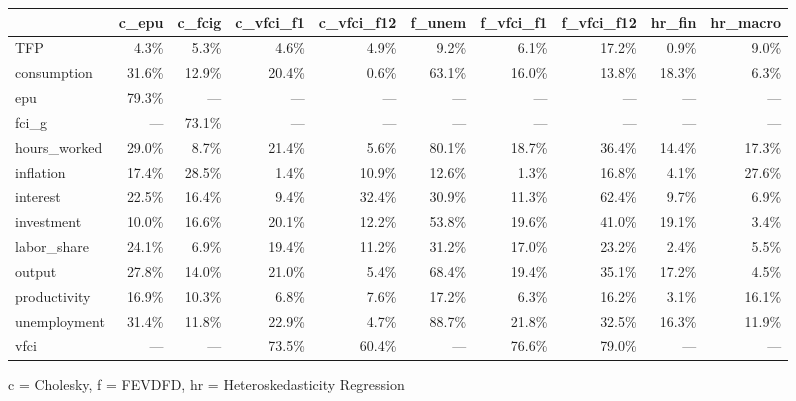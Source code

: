 
\fontsize{12.0pt}{14.4pt}\selectfont
\begin{tabular*}{\linewidth}{@{\extracolsep{\fill}}l|rrrrrrrrr}
\toprule
 & c\_epu & c\_fcig & c\_vfci\_f1 & c\_vfci\_f12 & f\_unem & f\_vfci\_f1 & f\_vfci\_f12 & hr\_fin & hr\_macro \\ 
\midrule\addlinespace[2.5pt]
TFP & 4.3\% & 5.3\% & 4.6\% & 4.9\% & 9.2\% & 6.1\% & 17.2\% & 0.9\% & 9.0\% \\ 
consumption & 31.6\% & 12.9\% & 20.4\% & 0.6\% & 63.1\% & 16.0\% & 13.8\% & 18.3\% & 6.3\% \\ 
epu & 79.3\% & — & — & — & — & — & — & — & — \\ 
fci\_g & — & 73.1\% & — & — & — & — & — & — & — \\ 
hours\_worked & 29.0\% & 8.7\% & 21.4\% & 5.6\% & 80.1\% & 18.7\% & 36.4\% & 14.4\% & 17.3\% \\ 
inflation & 17.4\% & 28.5\% & 1.4\% & 10.9\% & 12.6\% & 1.3\% & 16.8\% & 4.1\% & 27.6\% \\ 
interest & 22.5\% & 16.4\% & 9.4\% & 32.4\% & 30.9\% & 11.3\% & 62.4\% & 9.7\% & 6.9\% \\ 
investment & 10.0\% & 16.6\% & 20.1\% & 12.2\% & 53.8\% & 19.6\% & 41.0\% & 19.1\% & 3.4\% \\ 
labor\_share & 24.1\% & 6.9\% & 19.4\% & 11.2\% & 31.2\% & 17.0\% & 23.2\% & 2.4\% & 5.5\% \\ 
output & 27.8\% & 14.0\% & 21.0\% & 5.4\% & 68.4\% & 19.4\% & 35.1\% & 17.2\% & 4.5\% \\ 
productivity & 16.9\% & 10.3\% & 6.8\% & 7.6\% & 17.2\% & 6.3\% & 16.2\% & 3.1\% & 16.1\% \\ 
unemployment & 31.4\% & 11.8\% & 22.9\% & 4.7\% & 88.7\% & 21.8\% & 32.5\% & 16.3\% & 11.9\% \\ 
vfci & — & — & 73.5\% & 60.4\% & — & 76.6\% & 79.0\% & — & — \\ 
\bottomrule
\end{tabular*}
\begin{minipage}{\linewidth}
c = Cholesky, f = FEVDFD, hr = Heteroskedasticity Regression\\
\end{minipage}


